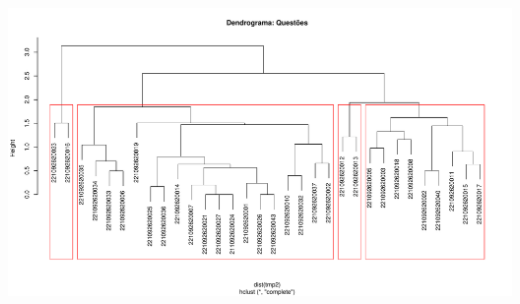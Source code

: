 \documentclass[
  landscape]{article}
\begin{document}
\begin{center}\includegraphics{analise_avaliacao_files/figure-latex/unnamed-chunk-3-2} \end{center}
\end{document}
